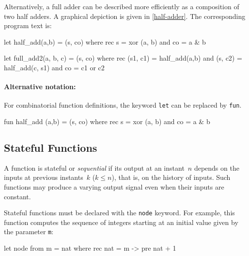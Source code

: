 \documentclass[11pt,titlepage,twoside]{report}
\newcommand{\zls}[1]{\texttt{#1}}
\begin{document}
Alternatively, a full adder can be described more efficiently as a composition
of two half adders. A graphical depiction is given in
\cref{half-adder}. The corresponding program text is:
\begin{runverbatim}
let half_add(a,b) = (s, co) where
   rec s = xor (a, b)
   and co = a & b
\end{runverbatim}

\begin{runverbatim}
let full_add2(a, b, c) = (s, co) where
  rec (s1, c1) = half_add(a,b)
  and (s, c2) = half_add(c, s1)
  and co = c1 or c2
\end{runverbatim}

\paragraph{Alternative notation:} For combinatorial function definitions, 
the keyword \zls{let} can be replaced by \zls{fun}.
\begin{runverbatim}[include=xor]
fun half_add (a,b) = (s, co) where
  rec s = xor (a, b)
  and co = a & b
\end{runverbatim}

\subsection{Stateful Functions}\label{sec:sequential-functions} %

A function is stateful or \emph{sequential} if its output at an instant~$n$ 
depends on the inputs at previous instants~$k$ ($k \leq n$), that is, on the 
history of inputs.
Such functions may produce a varying output signal even when their inputs 
are constant.

Stateful functions must be declared with the \zls{node} keyword.
For example, this function computes the sequence of integers starting at an 
initial value given by the parameter \zls{m}:
\begin{runverbatim}[withresult]
let node from m = nat where
  rec nat = m -> pre nat + 1
\end{runverbatim}
\end{document}
